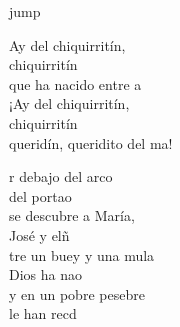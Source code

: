 \begin{cancion}[Chiquirritín][]jump\\
	\begin{chorus}%
		Ay del chiquirritín,\\
	\jump
	chiquirritín\\
		que ha nacido entre a\\
	\jump
	¡Ay del chiquirritín, \\
	\jump
	chiquirritín\\
		queridín, queridito del ma!\jump\\
	\end{chorus}%
	r debajo del arco \\
	del portao\\
	\jump
se descubre a María, \\
	José y elñ \\
	\jump
	tre un buey y una mula\\
	Dios ha nao\\
	\jump
y en un pobre pesebre \\
	le han recd\\
\end{cancion}%
